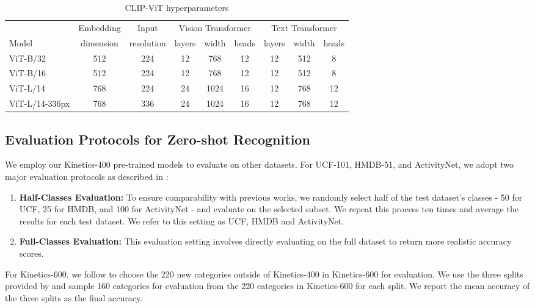 \documentclass[10pt,twocolumn,letterpaper]{article}
\begin{document}
\begin{table*}[h]
\centering
\begin{tabular}{l|cccccccc} \toprule
           & Embedding & Input      & \multicolumn{3}{c}{Vision Transformer} & \multicolumn{3}{c}{Text Transformer} \\
    Model  & dimension & resolution & layers & width & heads  & layers & width & heads \\ \midrule
    ViT-B/32 & 512 & 224 & 12 & 768 & 12 & 12 & 512 & 8 \\
    ViT-B/16 & 512 & 224 & 12 & 768 & 12 & 12 & 512 & 8 \\
    ViT-L/14 & 768 & 224 & 24 & 1024 & 16 & 12 & 768 & 12 \\
    ViT-L/14-336px  & 768 & 336 & 24 & 1024 & 16 & 12 & 768 & 12 \\
    \bottomrule
\end{tabular}
\caption{CLIP-ViT hyperparameters}
\label{vit}
\end{table*}

\subsection{Evaluation Protocols for Zero-shot Recognition}\label{sec:zero}
We employ our Kinetics-400 pre-trained models to evaluate on other datasets. For UCF-101, HMDB-51, and ActivityNet, we adopt two major evaluation protocols as described in \cite{E2E}:
\begin{enumerate}
\item \textbf{Half-Classes Evaluation:} To ensure comparability with previous works, we randomly select half of the test dataset's classes - 50 for UCF, 25 for HMDB, and 100 for ActivityNet - and evaluate on the selected subset. We repeat this process ten times and average the results for each test dataset. We refer to this setting as UCF, HMDB and ActivityNet.
\item \textbf{Full-Classes Evaluation:} This evaluation setting involves directly evaluating on the full dataset to return more realistic accuracy scores.
\end{enumerate}


For Kinetics-600, we follow \cite{ER} to choose the 220 new categories outside of Kinetics-400 in Kinetics-600 for evaluation. We use the three splits provided by \cite{ER} and sample 160 categories for evaluation from the 220 categories in Kinetics-600 for each split. We report the mean accuracy of the three splits as the final accuracy.
\end{document}
